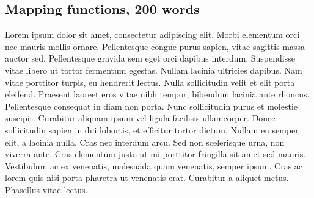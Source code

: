 \documentclass[techmemo]{ecmwfrep}%
\begin{document}
\subsection{Mapping functions, 200 words}
Lorem ipsum dolor sit amet, consectetur adipiscing elit. Morbi elementum orci nec mauris mollis ornare. Pellentesque congue purus sapien, vitae sagittis massa auctor sed. Pellentesque gravida sem eget orci dapibus interdum. Suspendisse vitae libero ut tortor fermentum egestas. Nullam lacinia ultricies dapibus. Nam vitae porttitor turpis, eu hendrerit lectus. Nulla sollicitudin velit et elit porta eleifend. Praesent laoreet eros vitae nibh tempor, bibendum lacinia ante rhoncus. Pellentesque consequat in diam non porta. Nunc sollicitudin purus et molestie suscipit. Curabitur aliquam ipsum vel ligula facilisis ullamcorper. Donec sollicitudin sapien in dui lobortis, et efficitur tortor dictum. Nullam eu semper elit, a lacinia nulla. Cras nec interdum arcu. Sed non scelerisque urna, non viverra ante. Cras elementum justo ut mi porttitor fringilla sit amet sed mauris. Vestibulum ac ex venenatis, malesuada quam venenatis, semper ipsum. Cras ac lorem quis nisi porta pharetra ut venenatis erat. Curabitur a aliquet metus. Phasellus vitae lectus.
\end{document}
